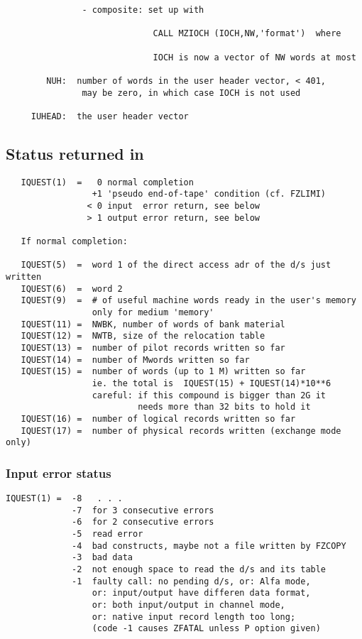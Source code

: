{\begin{verbatim}
               - composite: set up with

                             CALL MZIOCH (IOCH,NW,'format')  where

                             IOCH is now a vector of NW words at most

        NUH:  number of words in the user header vector, < 401,
               may be zero, in which case IOCH is not used

     IUHEAD:  the user header vector
\end{verbatim}

\subsection*{Status returned in }
\begin{verbatim}
   IQUEST(1)  =   0 normal completion
                 +1 'pseudo end-of-tape' condition (cf. FZLIMI)
                < 0 input  error return, see below
                > 1 output error return, see below

   If normal completion:

   IQUEST(5)  =  word 1 of the direct access adr of the d/s just written
   IQUEST(6)  =  word 2
   IQUEST(9)  =  # of useful machine words ready in the user's memory
                 only for medium 'memory'
   IQUEST(11) =  NWBK, number of words of bank material
   IQUEST(12) =  NWTB, size of the relocation table
   IQUEST(13) =  number of pilot records written so far
   IQUEST(14) =  number of Mwords written so far
   IQUEST(15) =  number of words (up to 1 M) written so far
                 ie. the total is  IQUEST(15) + IQUEST(14)*10**6
                 careful: if this compound is bigger than 2G it
                          needs more than 32 bits to hold it
   IQUEST(16) =  number of logical records written so far
   IQUEST(17) =  number of physical records written (exchange mode only)
\end{verbatim}

\subsubsection*{Input error status}

\begin{verbatim}
IQUEST(1) =  -8   . . .
             -7  for 3 consecutive errors
             -6  for 2 consecutive errors
             -5  read error
             -4  bad constructs, maybe not a file written by FZCOPY
             -3  bad data
             -2  not enough space to read the d/s and its table
             -1  faulty call: no pending d/s, or: Alfa mode,
                 or: input/output have differen data format,
                 or: both input/output in channel mode,
                 or: native input record length too long;
                 (code -1 causes ZFATAL unless P option given)


\end{verbatim}}
